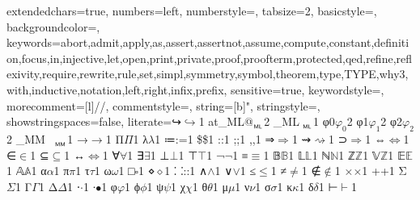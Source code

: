 {
	extendedchars=true,
	numbers=left,
	numberstyle={},
	tabsize=2,
	basicstyle={\footnotesize\sffamily\upshape}, %
	backgroundcolor=\color{white},
	keywords={abort,admit,apply,as,assert,assertnot,assume,compute,constant,definition,focus,in,injective,let,open,print,private,proof,proofterm,protected,qed,refine,reflexivity,require,rewrite,rule,set,simpl,symmetry,symbol,theorem,type,TYPE,why3,with,inductive,notation,left,right,infix,prefix},
	sensitive=true,
	keywordstyle=\color{blue},
	morecomment=[l]{//},
	commentstyle={\itshape\color{red}},
	string=[b]{"},
	stringstyle=\color{green},
	showstringspaces=false,
	literate={↪}{{{\color{blue}$\hookrightarrow$}}}1
	{at_ML}{{@${\mkern 0mu}_{{}_\mathsf{ML}}$}}2
	{_ML}{{${\mkern 5mu}_{{}_\mathsf{ML}}$}}1
	{φ0}{$\varphi_{0}$}2
	{φ1}{$\varphi_{1}$}2
	{φ2}{$\varphi_{2}$}2
	{_MM}{{${\mkern 15mu}_{{}_\mathsf{MM}}$}}1
	{→}{{{\color{blue}$\rightarrow$}}}1
	{Π}{{{\color{blue}$\Pi$}}}1
	{λ}{{{\color{blue}$\lambda$}}}1
	{≔}{{{\color{blue}:=}}}1
	{\$}{{{\color{blue}\$}}}1
	{:}{{{\color{blue}:}}}1
	{;}{{{\color{blue};}}}1
	{,}{{{\color{blue},}}}1
	{⇒}{$\Rightarrow$}1
	{⇝}{$\rightsquigarrow$}1
	{⊃}{$\Rightarrow$}1  %
	{⇔}{$\Leftrightarrow$}1
	{∈}{$\in$}1
	{⊆}{$\subseteq$}1
	{↔}{$\Leftrightarrow$}1
	{∀}{$\forall$}1
	{∃}{$\exists$}1
	{⊥}{$\bot$}1
	{⊤}{$\top$}1
	{¬}{$\neg$}1
	{≡}{$\equiv$}1
        {𝔹}{$\mathbb{B}$}1 {𝕃}{$\mathbb{L}$}1
	{ℕ}{$\mathbb{N}$}1 {ℤ}{$\mathbb{Z}$}1 {𝕍}{$\mathbb{Z}$}1
	{𝔼}{$\mathbb{E}$}1 {𝔸}{$\mathbb{A}$}1
	{α}{$\alpha$}1 {π}{$\pi$}1 {τ}{$\tau$}1 {ω}{$\omega$}1
	{□}{$\square$}1
	{⋄}{$\diamond$}1
	{⸬}{::}1
	{∧}{$\wedge$}1 {∨}{$\lor$}1
	{≤}{$\le$}1 {≠}{$\neq$}1 {∉}{$\notin$}1
	{×}{$\times$}1 {+}{+}1
	{Σ}{$\Sigma$}1
	{Γ}{$\Gamma$}1
	{Δ}{$\Delta$}1
	{⋅}{$\cdot$}1
	{∙}{$\bullet$}1
	{φ}{$\varphi$}1
	{ϕ}{$\phi$}1
	{ψ}{$\psi$}1
	{χ}{$\chi$}1
	{θ}{$\theta$}1
	{μ}{$\mu$}1
	{ν}{$\nu$}1
	{σ}{$\sigma$}1
	{κ}{$\kappa$}1
	{δ}{$\delta$}1
	{⊢}{$\vdash$}1
}
